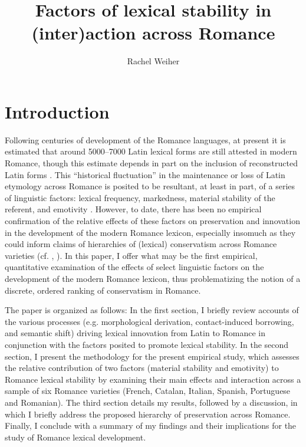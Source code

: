 \documentclass[output=paper,colorlinks,citecolor=brown,
]{langscibook}
\author{Rachel Weiher\affiliation{University of California, Berkeley}}
\title{Factors of lexical stability in (inter)action across Romance}
\begin{document}
\maketitle

\section*{Introduction}
Following centuries of development of the Romance languages, at present it is estimated that around 5000--7000 Latin lexical forms are still attested in modern Romance, though this estimate depends in part on the inclusion of reconstructed Latin forms \citep[568]{stefenelli_lexical_2011}. This “historical fluctuation” \citep[91]{banniard_transition_2013} in the maintenance or loss of Latin etymology across Romance is posited to be resultant, at least in part, of a series of linguistic factors: lexical frequency, markedness, material stability of the referent, and emotivity \citep[578--580]{stefenelli_lexical_2011}. However, to date, there has been no empirical confirmation of the relative effects of these factors on preservation and innovation in the development of the modern Romance lexicon, especially insomuch as they could inform claims of hierarchies of (lexical) conservatism across Romance varieties (cf. \citealt{stefenelli_lexical_2011}, \citealt{posner_romance_1996}). In this paper, I offer what may be the first empirical, quantitative examination of the effects of select linguistic factors on the development of the modern Romance lexicon, thus problematizing the notion of a discrete, ordered ranking of conservatism in Romance. 

The paper is organized as follows: In the first section, I briefly review accounts of the various processes (e.g. morphological derivation, contact-induced borrowing, and semantic shift) driving lexical innovation from Latin to Romance in conjunction with the factors posited to promote lexical stability. In the second section, I present the methodology for the present empirical study, which assesses the relative contribution of two factors (material stability and emotivity) to Romance lexical stability by examining their main effects and interaction across a sample of six Romance varieties (French, Catalan, Italian, Spanish, Portuguese and Romanian). The third section details my results, followed by a discussion, in which I briefly address the proposed hierarchy of preservation \citep[582]{stefenelli_lexical_2011} across Romance. Finally, I conclude with a summary of my findings and their implications for the study of Romance lexical development.
\end{document}
